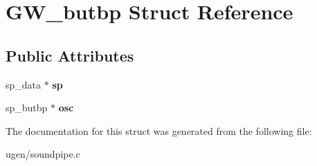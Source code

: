 \hypertarget{structGW__butbp}{}\section{G\+W\+\_\+butbp Struct Reference}
\label{structGW__butbp}
\subsection*{Public Attributes}
\begin{DoxyCompactItemize}
\item 
\hypertarget{structGW__butbp_aee8775018ddaf40281f054a598fed066}{}\label{structGW__butbp_aee8775018ddaf40281f054a598fed066} 
sp\+\_\+data $\ast$ {\bfseries sp}
\item 
\hypertarget{structGW__butbp_a73ef6d9d2faaae3667ea9a47c9ad962a}{}\label{structGW__butbp_a73ef6d9d2faaae3667ea9a47c9ad962a} 
sp\+\_\+butbp $\ast$ {\bfseries osc}
\end{DoxyCompactItemize}


The documentation for this struct was generated from the following file\+:\begin{DoxyCompactItemize}
\item 
ugen/soundpipe.\+c\end{DoxyCompactItemize}
